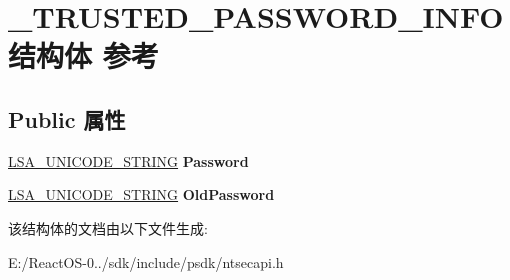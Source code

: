 \hypertarget{struct___t_r_u_s_t_e_d___p_a_s_s_w_o_r_d___i_n_f_o}{}\section{\+\_\+\+T\+R\+U\+S\+T\+E\+D\+\_\+\+P\+A\+S\+S\+W\+O\+R\+D\+\_\+\+I\+N\+F\+O结构体 参考}
\label{struct___t_r_u_s_t_e_d___p_a_s_s_w_o_r_d___i_n_f_o}
\subsection*{Public 属性}
\begin{DoxyCompactItemize}
\item 
\mbox{\label{struct___t_r_u_s_t_e_d___p_a_s_s_w_o_r_d___i_n_f_o_af0cfd7b2d617011c6ec23a1cbe0edfbd}} 
\hyperlink{struct___l_s_a___u_n_i_c_o_d_e___s_t_r_i_n_g}{L\+S\+A\+\_\+\+U\+N\+I\+C\+O\+D\+E\+\_\+\+S\+T\+R\+I\+NG} {\bfseries Password}
\item 
\mbox{\label{struct___t_r_u_s_t_e_d___p_a_s_s_w_o_r_d___i_n_f_o_a6e50a5d79be491834db8adcccdda7e4a}} 
\hyperlink{struct___l_s_a___u_n_i_c_o_d_e___s_t_r_i_n_g}{L\+S\+A\+\_\+\+U\+N\+I\+C\+O\+D\+E\+\_\+\+S\+T\+R\+I\+NG} {\bfseries Old\+Password}
\end{DoxyCompactItemize}


该结构体的文档由以下文件生成\+:\begin{DoxyCompactItemize}
\item 
E\+:/\+React\+O\+S-\/0../sdk/include/psdk/ntsecapi.\+h\end{DoxyCompactItemize}
